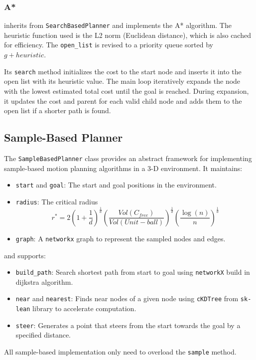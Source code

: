 \documentclass[conference]{IEEEtran}
\begin{document}
\subsubsection{A*}
inherits from \texttt{SearchBasedPlanner} and implements the A* algorithm.
The heuristic function used is the L2 norm (Euclidean distance), which is also cached for efficiency. 
The \texttt{open\_list} is revised to a priority queue sorted by $g + heuristic$.

Its \texttt{search} method initializes the cost to the start node 
and inserts it into the open list with its heuristic value. 
The main loop iteratively expands the node with the lowest estimated total cost until the goal is reached. 
During expansion, it updates the cost and parent for each valid child node 
and adds them to the open list if a shorter path is found.

\subsection{Sample-Based Planner}
The \texttt{SampleBasedPlanner} class provides an abstract framework for implementing sample-based motion planning algorithms in a 3-D environment. It maintains:
\begin{itemize}
    \item \texttt{start} and \texttt{goal}: The start and goal positions in the environment.
    \item \texttt{radius}: The critical radius
    $$r^* = 2\left( 1+\frac{1}{d}  \right)^{\frac{1}{d} } \left( \frac{Vol(C_{free})}{Vol(Unit-ball)}  \right)^{\frac{1}{d} } \left( \frac{\log \left( n \right) }{n}  \right)^{\frac{1}{d} } $$
    \item \texttt{graph}: A \texttt{networkx} graph to represent the sampled nodes and edges.
\end{itemize}
and supports:
\begin{itemize}
    \item \texttt{build\_path}: Search shortest path from start to goal 
    using \texttt{networkX} build in dijkstra algorithm.
    \item \texttt{near} and \texttt{nearest}: Finds near nodes of a given node
    using \texttt{cKDTree} from \texttt{sk-lean} library to accelerate computation.
    \item \texttt{steer}: Generates a point that steers from the start towards the goal by a specified distance.
\end{itemize}
All sample-based implementation only need to overload the \texttt{sample} method.
\end{document}
